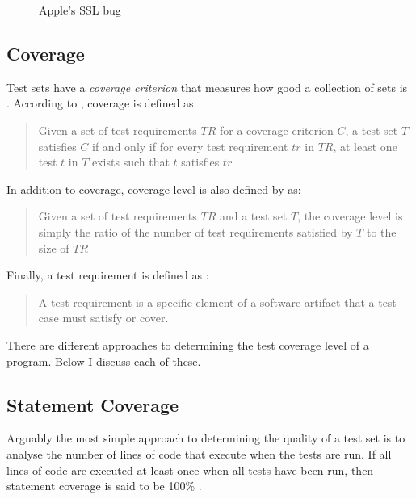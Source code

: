 \begin{figure}
	\centering
	
	\caption{Apple's SSL bug}
	\label{fig:AppleBug}
\end{figure}

\subsection{Coverage}

Test sets have a \emph{coverage criterion} that measures how good a collection of sets is \citep{softwareTestingIntro}. According to \citet{softwareTestingIntro}, coverage is defined as:

\begin{quote} Given a set of test requirements $TR$ for a coverage criterion $C$, a test set $T$ satisfies $C$ if and only if for every test requirement $tr$ in $TR$, at least one test $t$ in $T$ exists such that $t$ satisfies $tr$ \end{quote}

In addition to coverage, coverage level is also defined by \citep{softwareTestingIntro} as:

\begin{quote}Given a set of test requirements $TR$ and a test set $T$, the coverage level is simply the ratio of the number of test requirements satisfied by $T$ to the size of $TR$\end{quote}

Finally, a test requirement is defined as \cite{softwareTestingIntro}:

\begin{quote}A test requirement is a speciﬁc element of a software artifact that a test case must satisfy or cover.\end{quote}

There are different approaches to determining the test coverage level of a program. Below I discuss each of these.

\subsection{Statement Coverage}

Arguably the most simple approach to determining the quality of a test set is to analyse the number of lines of code that execute when the tests are run. If all lines of code are executed at least once when all tests have been run, then statement coverage is said to be 100\% \citep{softwareTestingIntro}.

